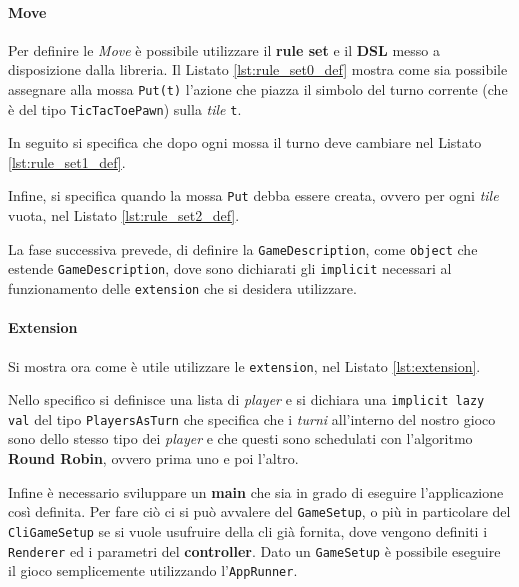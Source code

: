 \paragraph{Move}
Per definire le \textit{Move} è possibile utilizzare il \textbf{rule set} e il \textbf{DSL} messo a disposizione dalla libreria.
%
Il Listato \ref{lst:rule_set0_def} mostra come sia possibile assegnare alla mossa \texttt{Put(t)} l'azione che piazza il simbolo del turno corrente (che è del tipo \texttt{TicTacToePawn}) sulla \textit{tile} \texttt{t}.
%

%
In seguito si specifica che dopo ogni mossa il turno deve cambiare nel Listato \ref{lst:rule_set1_def}.

%
Infine, si specifica quando la mossa \texttt{Put} debba essere creata, ovvero per ogni \textit{tile} vuota, nel Listato \ref{lst:rule_set2_def}.
%


La fase successiva prevede, di definire la \texttt{GameDescription}, come \texttt{object} che estende \texttt{GameDescription}, dove sono dichiarati gli \texttt{implicit} necessari al funzionamento delle \texttt{extension} che si desidera utilizzare.

\paragraph{Extension}
%
Si mostra ora come è utile utilizzare le \texttt{extension}, nel Listato \ref{lst:extension}.
%

%
Nello specifico si definisce una lista di \textit{player} e si dichiara una \texttt{implicit lazy val} del tipo \texttt{PlayersAsTurn} che specifica che i \textit{turni} all'interno del nostro gioco sono dello stesso tipo dei \textit{player} e che questi sono schedulati con l'algoritmo \textbf{Round Robin}, ovvero prima uno e poi l'altro.

Infine è necessario sviluppare un \textbf{main} che sia in grado di eseguire l'applicazione così definita.
%
Per fare ciò ci si può avvalere del \texttt{GameSetup}, o più in particolare del \texttt{CliGameSetup} se si vuole usufruire della cli già fornita, dove vengono definiti i \texttt{Renderer} ed i parametri del \textbf{controller}.
%
Dato un \texttt{GameSetup} è possibile eseguire il gioco semplicemente utilizzando l'\texttt{AppRunner}.